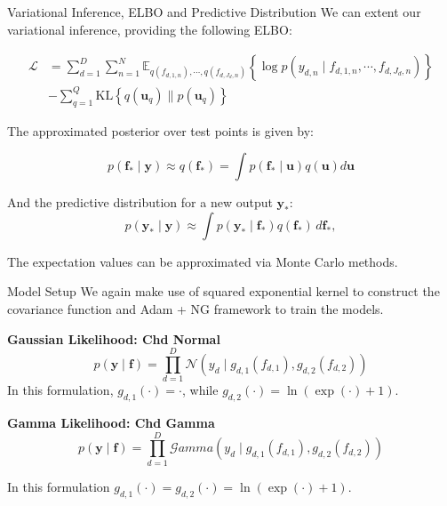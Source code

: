 \begin{frame}{Variational Inference, ELBO and Predictive Distribution}
	We can extent our variational inference, providing the following ELBO:
	
\begin{equation*}
	\begin{split}
	\mathcal{L} &= \sum_{d=1}^D \sum_{n=1}^{N} \mathbb{E}_{q(f_{d,1,n}), \cdots, q(f_{d,J_d,n})} 
	\left\{ \log p\left( y_{d,n} \mid f_{d,1,n}, \cdots, f_{d,J_d,n} \right) \right\} \\
	&- \sum_{q=1}^Q \text{KL}\left\{ q(\mathbf{u}_q) \parallel p(\mathbf{u}_q) \right\}
	\end{split}
\end{equation*}

The approximated posterior over test points is given by:

\begin{equation*}
	p(\mathbf{f}_* \mid \mathbf{y}) \approx q(\mathbf{f}_*) = \int p(\mathbf{f}_* \mid \mathbf{u}) q(\mathbf{u}) d\mathbf{u}
\end{equation*}

And the predictive distribution for a new output $\mathbf{y}_*$:
\begin{equation*}
	p(\mathbf{y}_* \mid \mathbf{y}) \approx \int p(\mathbf{y}_* \mid \mathbf{f}_*) q(\mathbf{f}_*) \, d\mathbf{f}_*,
\end{equation*}

The expectation values can be approximated via Monte Carlo methods.
	
\end{frame}

\begin{frame}{Model Setup}
	We again make use of squared exponential kernel to construct the covariance function and Adam + NG framework to train the models.
		
	\begin{block}{\textbf{Gaussian Likelihood: Chd Normal}}
		\begin{equation*}
			p(\mathbf{y} \mid \mathbf{f}) = \prod_{d=1}^{D} \mathcal{N}\left(y_{d}\mid g_{d,1}(f_{d,1}), g_{d,2}(f_{d,2}) \right)
		\end{equation*}
		In this formulation, \(g_{d,1}(\cdot) = \cdot\), while \(g_{d,2}(\cdot) = \ln(\exp(\cdot) + 1)\).
	\end{block} 
	
	\begin{block}{\textbf{Gamma Likelihood: Chd Gamma}}
		\begin{equation*}
		p(\mathbf{y} \mid \mathbf{f}) = \prod_{d=1}^{D} \mathcal{G}amma\left( y_{d} \mid g_{d,1}(f_{d,1}), g_{d,2}(f_{d,2}) \right)
		\end{equation*}
		
		In this formulation \(g_{d,1}(\cdot) = g_{d,2}(\cdot) = \ln(\exp(\cdot) + 1)\).
	\end{block}
		
\end{frame}

